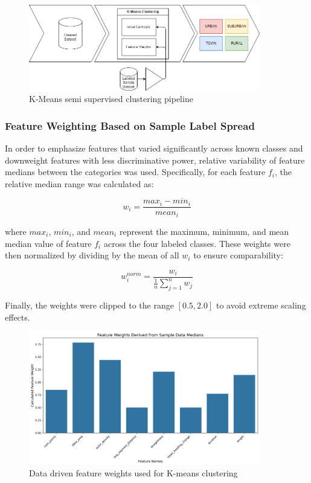 \documentclass[a4paper,12pt,twoside]{scrreprt}
\begin{document}
\begin{figure}[htbp]
  \centering

  \includegraphics[width=0.9\textwidth]{Diagrams/drawio/implementation/clustering_pipeline.png}
  \caption{K-Means semi supervised clustering pipeline}
  \label{fig:kmeans-clustering-pipline}
\end{figure}
\FloatBarrier

\subsubsection{Feature Weighting Based on Sample Label Spread}

In order to emphasize features that varied significantly across known classes
and downweight features with less discriminative power, relative variability of
feature medians between the categories was used. Specifically, for each feature
$f_i$, the relative median range was calculated as:

\[
  w_i = \frac{max_i - min_i}{mean_i}
\]

where $max_i$, $min_i$, and $mean_i$ represent the
maximum, minimum, and mean median value of feature $f_i$ across the four
labeled classes. These weights were then normalized by dividing by the mean of
all $w_i$ to ensure comparability:

\[
  w_i^{norm} = \frac{w_i}{\frac{1}{n}\sum_{j=1}^n w_j}
\]

Finally, the weights were clipped to the range $[0.5, 2.0]$ to avoid extreme
scaling effects.

\begin{figure}[htbp]
  \centering

  \includegraphics[width=0.9\textwidth]{Figures/feature_weights.png}
  \caption{Data driven feature weights used for K-means clustering}
  \label{fig:kmeans-clustering-feature-weight}
\end{figure}
\FloatBarrier
\end{document}
